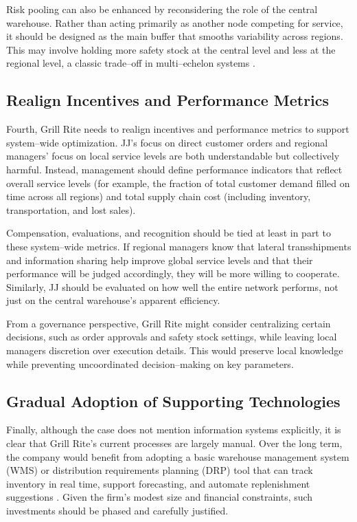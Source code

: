 \documentclass[12pt,a4paper]{article}
\begin{document}
Risk pooling can also be enhanced by reconsidering the role of the central warehouse. Rather than acting primarily as another node competing for service, it should be designed as the main buffer that smooths variability across regions. This may involve holding more safety stock at the central level and less at the regional level, a classic trade–off in multi–echelon systems \citep{stevenson2017operations}.

\subsection{Realign Incentives and Performance Metrics}

Fourth, Grill Rite needs to realign incentives and performance metrics to support system–wide optimization. JJ's focus on direct customer orders and regional managers' focus on local service levels are both understandable but collectively harmful. Instead, management should define performance indicators that reflect overall service levels (for example, the fraction of total customer demand filled on time across all regions) and total supply chain cost (including inventory, transportation, and lost sales).

Compensation, evaluations, and recognition should be tied at least in part to these system–wide metrics. If regional managers know that lateral transshipments and information sharing help improve global service levels and that their performance will be judged accordingly, they will be more willing to cooperate. Similarly, JJ should be evaluated on how well the entire network performs, not just on the central warehouse's apparent efficiency.

From a governance perspective, Grill Rite might consider centralizing certain decisions, such as order approvals and safety stock settings, while leaving local managers discretion over execution details. This would preserve local knowledge while preventing uncoordinated decision–making on key parameters.

\subsection{Gradual Adoption of Supporting Technologies}

Finally, although the case does not mention information systems explicitly, it is clear that Grill Rite's current processes are largely manual. Over the long term, the company would benefit from adopting a basic warehouse management system (WMS) or distribution requirements planning (DRP) tool that can track inventory in real time, support forecasting, and automate replenishment suggestions \citep{stevenson2017operations}. Given the firm’s modest size and financial constraints, such investments should be phased and carefully justified.
\end{document}
